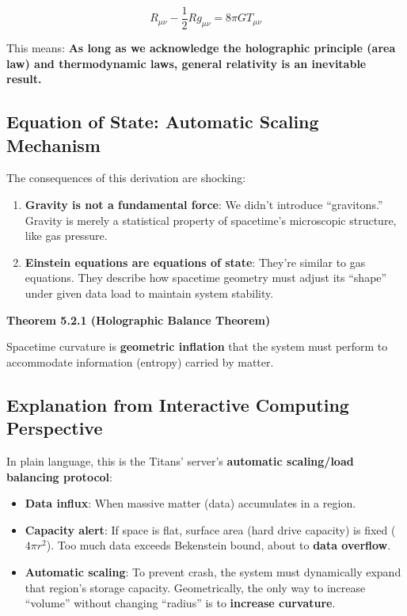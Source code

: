 \[
R_{\mu\nu} - \frac{1}{2}Rg_{\mu\nu} = 8\pi G T_{\mu\nu}
\]

This means: \textbf{As long as we acknowledge the holographic principle (area law) and thermodynamic laws, general relativity is an inevitable result.}

\subsection{Equation of State: Automatic Scaling Mechanism}

The consequences of this derivation are shocking:

\begin{enumerate}
\item \textbf{Gravity is not a fundamental force}: We didn't introduce ``gravitons.'' Gravity is merely a statistical property of spacetime's microscopic structure, like gas pressure.
\item \textbf{Einstein equations are equations of state}: They're similar to gas equations. They describe how spacetime geometry must adjust its ``shape'' under given data load to maintain system stability.
\end{enumerate}

\textbf{Theorem 5.2.1 (Holographic Balance Theorem)}

Spacetime curvature is \textbf{geometric inflation} that the system must perform to accommodate information (entropy) carried by matter.

\subsection{Explanation from Interactive Computing Perspective}

In plain language, this is the Titans' server's \textbf{automatic scaling/load balancing protocol}:

\begin{itemize}
\item \textbf{Data influx}: When massive matter (data) accumulates in a region.
\item \textbf{Capacity alert}: If space is flat, surface area (hard drive capacity) is fixed ($4\pi r^2$). Too much data exceeds Bekenstein bound, about to \textbf{data overflow}.
\item \textbf{Automatic scaling}: To prevent crash, the system must dynamically expand that region's storage capacity. Geometrically, the only way to increase ``volume'' without changing ``radius'' is to \textbf{increase curvature}.
\end{itemize}

